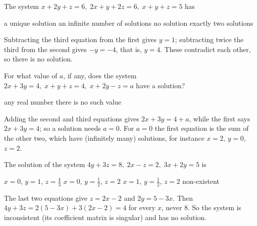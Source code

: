 \begin{question}[id=gate-me2003-1, source=GATE ME 2003]
The system $x + 2y + z = 6,\; 2x + y + 2z = 6,\; x + y + z = 5$ has
\begin{options}
  \option a unique solution
  \option an infinite number of solutions
  \correct no solution
  \option exactly two solutions
\end{options}
\begin{solution}
Subtracting the third equation from the first gives $y = 1$; subtracting twice the third from the second gives $-y = -4$, that is, $y = 4$. These contradict each other, so there is no solution.
\end{solution}
\end{question}

\begin{question}[id=gate-me2008-1, source=GATE ME 2008, marks=2]
For what value of $a$, if any, does the system $2x + 3y = 4,\; x + y + z = 4,\; x + 2y - z = a$ have a solution?
\begin{options}
  \option any real number
  \option there is no such value
\end{options}
\begin{solution}
Adding the second and third equations gives $2x + 3y = 4 + a$, while the first says $2x + 3y = 4$; so a solution needs $a = 0$. For $a = 0$ the first equation is the sum of the other two, which have (infinitely many) solutions, for instance $x = 2$, $y = 0$, $z = 2$.
\end{solution}
\end{question}

\begin{question}[id=gate-ce2006-1, source=GATE CE 2006, marks=2]
The solution of the system $4y + 3z = 8,\; 2x - z = 2,\; 3x + 2y = 5$ is
\begin{options}
  \option $x = 0$, $y = 1$, $z = \frac{4}{3}$
  \option $x = 0$, $y = \frac{1}{2}$, $z = 2$
  \option $x = 1$, $y = \frac{1}{2}$, $z = 2$
  \correct non-existent
\end{options}
\begin{solution}
The last two equations give $z = 2x - 2$ and $2y = 5 - 3x$. Then $4y + 3z = 2(5 - 3x) + 3(2x - 2) = 4$ for every $x$, never 8. So the system is inconsistent (its coefficient matrix is singular) and has no solution.
\end{solution}
\end{question}

